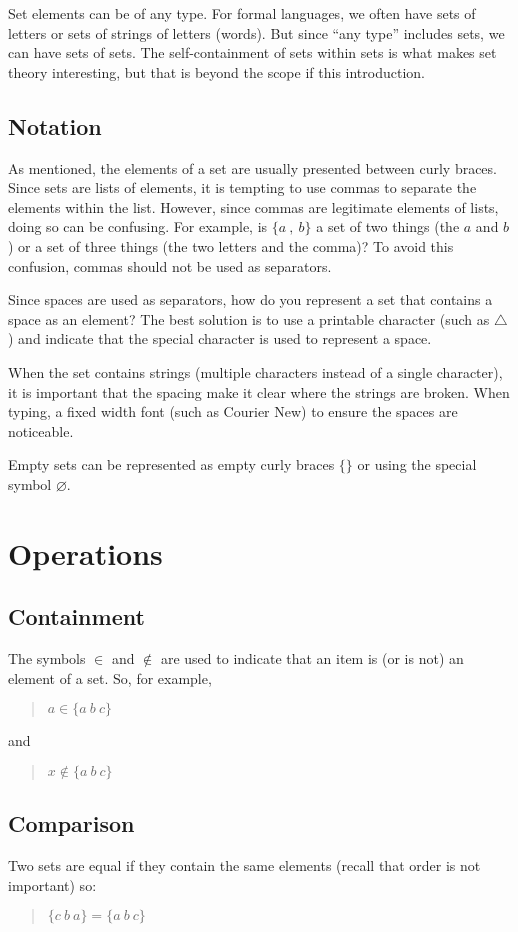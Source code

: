 \documentclass[letterpaper,12pt,openany,reqno]{book}%
\begin{document}
Set elements can be of any type. For formal languages, we often have sets of letters or sets of strings of letters (words). But since ``any type'' includes sets, we can have sets of sets. The self-containment of sets within sets is what makes set theory interesting, but that is beyond the scope if this introduction.

\subsection{Notation}
As mentioned, the elements of a set are usually presented between curly braces. Since sets are lists of elements, it is tempting to use commas to separate the elements within the list. However, since commas are legitimate elements of lists, doing so can be confusing. For example, is $\{a\ ,\ b\}$ a set of two things (the $a$ and $b$) or a set of three things (the two letters and the comma)? To avoid this confusion, commas should not be used as separators. 

Since spaces are used as separators, how do you represent a set that contains a space as an element? The best solution is to use a printable character (such as $\triangle$) and indicate that the special character is used to represent a space.

When the set contains strings (multiple characters instead of a single character), it is important that the spacing make it clear where the strings are broken. When typing, a fixed width font (such as Courier New) to ensure the spaces are noticeable. 

Empty sets can be represented as empty curly braces $\{\}$ or using the special symbol $\varnothing$.

\section{Operations}
\subsection{Containment}

The symbols $\in$ and $\notin$ are used to indicate that an item is (or is not) an element of a set. So, for example,
\begin{quote}
$a \in \{ a \ b \ c\}$
\end{quote}
and
\begin{quote}
$x \notin \{ a \ b \ c\}$
\end{quote}

\subsection{Comparison}
Two sets are equal if they contain the same elements (recall that order is not important) so:
\begin{quote}
$\{ c \ b \ a\} = \{ a \ b \ c\}$
\end{quote}
\end{document}
